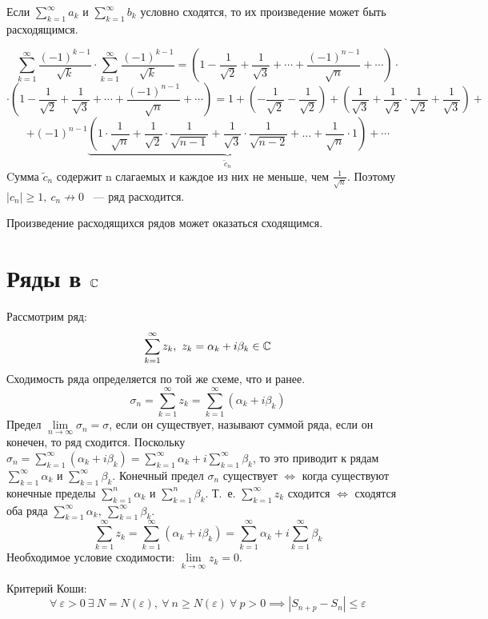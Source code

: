 \documentclass[../../main.tex]{subfiles}
\begin{document}
Если $\sum\limits_{k = 1}^{\infty} a_k$ и
$\sum\limits_{k = 1}^{\infty} b_k$ условно сходятся, то их произведение
может быть расходящимся.
\begin{example}
	\[\sum\limits_{k = 1}^{\infty} \frac{(-1)^{k-1}}{\sqrt{k}} \cdot
	\sum\limits_{k = 1}^{\infty} \frac{(-1)^{k-1}}{\sqrt{k}} =
	\left(1 - \frac{1}{\sqrt{2}} + \frac{1}{\sqrt{3}} + \cdots +
	\frac{(-1)^{n-1}}{\sqrt{n}} + \cdots \right) \cdot \]
	\[\cdot \left(1 - \frac{1}{\sqrt{2}} + \frac{1}{\sqrt{3}} + \cdots +
	\frac{(-1)^{n-1}}{\sqrt{n}} + \cdots \right) = 1 +
	\left( - \frac{1}{\sqrt{2}} - \frac{1}{\sqrt{2}} \right) +
	\left( \frac{1}{\sqrt{3}} + \frac{1}{\sqrt{2}} \cdot
	\frac{1}{\sqrt{2}} + \frac{1}{\sqrt{3}} \right) + \] 
	\[ + \left( -1 \right) ^ {n - 1}
	\underbrace{\left(1 \cdot \frac{1}{\sqrt{n}} + \frac{1}{\sqrt{2}} \cdot
	\frac{1}{\sqrt{n - 1}} + \frac{1}{\sqrt{3}} \cdot
	\frac{1}{\sqrt{n - 2}} + \ldots + \frac{1}{\sqrt{n}}
	\cdot 1\right)}_{\tilde{c}_n} + \cdots \]
	Cумма $\tilde{c}_n$ содержит n слагаемых и каждое из них не меньше,
	чем $\frac{1}{\sqrt{n}}$. Поэтому $|c_n| \geq 1, \ c_n \not\to 0$
	~--- ряд расходится.
\end{example}
\begin{remark}
	Произведение расходящихся рядов может оказаться сходящимся.
\end{remark}
\section{Ряды в $\mathbb{C}$}
Рассмотрим ряд:
\[\sum\limits_{k = 1}^{\infty} z_k , \ z_k =
\alpha_k + i\beta_k \in \mathbb{C}\]
Сходимость ряда определяется по той же схеме, что и ранее.
\[ \sigma_n = \sum\limits_{k = 1}^{\infty} z_k =
\sum\limits_{k = 1}^{\infty} (\alpha_k + i\beta_k)\]
Предел $\lim\limits_{n \to \infty} \sigma_n = \sigma$,
если он существует, называют суммой ряда, если он конечен, то ряд сходится.
Поскольку $\sigma_n = \sum\limits_{k = 1}^{\infty} (\alpha_k + i\beta_k) =
\sum\limits_{k = 1}^{\infty} \alpha_k +
i \sum\limits_{k = 1}^{\infty} \beta_k$,
то это приводит к рядам $\sum\limits_{k = 1}^{\infty} \alpha_k$ и
$\sum\limits_{k = 1}^{\infty} \beta_k$.
Конечный предел $\sigma_n$ существует $\iff$ когда
существуют конечные пределы $\sum\limits_{k = 1}^{n} \alpha_k$ и
$\sum\limits_{k = 1}^{n} \beta_k$.
Т.~е. $\sum\limits_{k = 1}^{\infty} z_k$ сходится $\iff$
сходятся оба ряда $\sum\limits_{k = 1}^{\infty} \alpha_k , \
\sum\limits_{k = 1}^{\infty} \beta_k$.
\[\sum\limits_{k = 1}^{\infty} z_k = \sum\limits_{k = 1}^{\infty}
(\alpha_k + i\beta_k) = \sum\limits_{k = 1}^{\infty} \alpha_k +
i\sum\limits_{k = 1}^{\infty} \beta_k\]
Необходимое условие сходимости: $\lim\limits_{k \to \infty} z_k = 0$.

Критерий Коши:
\[ \forall \ \varepsilon > 0 \ \exists \ N = N(\varepsilon), \ \forall \
n \geq N(\varepsilon) \ \forall \ p > 0 \implies
|S_{n + p} - S_n| \leq \varepsilon \]
\end{document}
